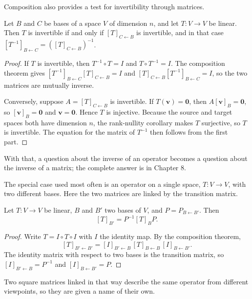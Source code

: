 Composition also provides a test for invertibility through matrices.

\begin{proposisi}
Let $B$ and $C$ be bases of a space $V$ of dimension $n$, and let $T\colon V\to V$ be linear. Then
$T$ is invertible if and only if $[T]_{C\leftarrow B}$ is invertible, and in that case
$[T^{-1}]_{B\leftarrow C}=([T]_{C\leftarrow B})^{-1}$.
\end{proposisi}

\begin{proof}
If $T$ is invertible, then $T^{-1}\circ T=I$ and $T\circ T^{-1}=I$. The composition theorem gives
$[T^{-1}]_{B\leftarrow C}[T]_{C\leftarrow B}=I$ and
$[T]_{C\leftarrow B}[T^{-1}]_{B\leftarrow C}=I$, so the two matrices are mutually inverse.

Conversely, suppose $A=[T]_{C\leftarrow B}$ is invertible. If $T(\mathbf{v})=\mathbf{0}$, then
$A[\mathbf{v}]_{B}=\mathbf{0}$, so $[\mathbf{v}]_{B}=\mathbf{0}$ and
$\mathbf{v}=\mathbf{0}$.
Hence $T$ is injective. Because the source and target spaces both have dimension $n$, the
rank-nullity corollary makes $T$ surjective, so $T$ is invertible. The equation for the matrix of
$T^{-1}$
then follows from the first part.
\end{proof}

With that, a question about the inverse of an operator becomes a question about the inverse of a
matrix; the complete answer is in Chapter 8.

The special case used most often is an operator on a single space, $T\colon V\to V$,
with two different bases. Here the two matrices are linked by the transition matrix.

\begin{teorema}
Let $T\colon V\to V$ be linear, $B$ and $B'$ two bases of $V$, and $P=P_{B\leftarrow B'}$.
Then
\[
  [T]_{B'}=P^{-1}[T]_{B}P .
\]
\end{teorema}

\begin{proof}
Write $T=I\circ T\circ I$ with $I$ the identity map. By the composition theorem,
\[
  [T]_{B'\leftarrow B'}=[I]_{B'\leftarrow B}\,[T]_{B\leftarrow B}\,[I]_{B\leftarrow B'}.
\]
The identity matrix with respect to two bases is the transition matrix, so
$[I]_{B'\leftarrow B}=P^{-1}$ and $[I]_{B\leftarrow B'}=P$.
\end{proof}

Two square matrices linked in that way describe the same operator from
different viewpoints, so they are given a name of their own.

